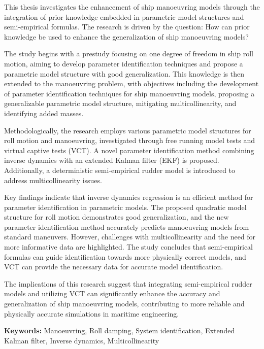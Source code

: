This thesis investigates the enhancement of ship manoeuvring models through the integration of prior knowledge embedded in parametric model structures and semi-empirical formulas. The research is driven by the question: How can prior knowledge be used to enhance the generalization of ship manoeuvring models?

The study begins with a prestudy focusing on one degree of freedom in ship roll motion, aiming to develop parameter identification techniques and propose a parametric model structure with good generalization. This knowledge is then extended to the manoeuvring problem, with objectives including the development of parameter identification techniques for ship manoeuvring models, proposing a generalizable parametric model structure, mitigating multicollinearity, and identifying added masses.

Methodologically, the research employs various parametric model structures for roll motion and manoeuvring, investigated through free running model tests and virtual captive tests (VCT). A novel parameter identification method combining inverse dynamics with an extended Kalman filter (EKF) is proposed. Additionally, a deterministic semi-empirical rudder model is introduced to address multicollinearity issues.

Key findings indicate that inverse dynamics regression is an efficient method for parameter identification in parametric models. The proposed quadratic model structure for roll motion demonstrates good generalization, and the new parameter identification method accurately predicts manoeuvring models from standard maneuvers. However, challenges with multicollinearity and the need for more informative data are highlighted. The study concludes that semi-empirical formulas can guide identification towards more physically correct models, and VCT can provide the necessary data for accurate model identification.

The implications of this research suggest that integrating semi-empirical rudder models and utilizing VCT can significantly enhance the accuracy and generalization of ship manoeuvring models, contributing to more reliable and physically accurate simulations in maritime engineering.


\vspace{0.3cm}
\noindent\textbf{Keywords:} Manoeuvring, Roll damping, System identification, Extended Kalman filter, Inverse dynamics, Multicollinearity
\cleardoublepage
